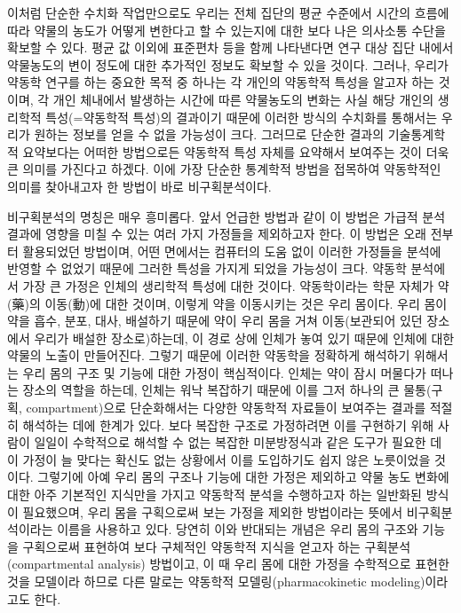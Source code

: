 \documentclass[
  11pt,
  krantz2, a4paper, twoside]{krantz}
\begin{document}
이처럼 단순한 수치화 작업만으로도 우리는 전체 집단의 평균 수준에서 시간의 흐름에 따라 약물의 농도가 어떻게 변한다고 할 수 있는지에 대한 보다 나은 의사소통 수단을 확보할 수 있다. 평균 값 이외에 표준편차 등을 함께 나타낸다면 연구 대상 집단 내에서 약물농도의 변이 정도에 대한 추가적인 정보도 확보할 수 있을 것이다. 그러나, 우리가 약동학 연구를 하는 중요한 목적 중 하나는 각 개인의 약동학적 특성을 알고자 하는 것이며, 각 개인 체내에서 발생하는 시간에 따른 약물농도의 변화는 사실 해당 개인의 생리학적 특성(=약동학적 특성)의 결과이기 때문에 이러한 방식의 수치화를 통해서는 우리가 원하는 정보를 얻을 수 없을 가능성이 크다. 그러므로 단순한 결과의 기술통계학적 요약보다는 어떠한 방법으로든 약동학적 특성 자체를 요약해서 보여주는 것이 더욱 큰 의미를 가진다고 하겠다. 이에 가장 단순한 통계학적 방법을 접목하여 약동학적인 의미를 찾아내고자 한 방법이 바로 비구획분석이다.

비구획분석의 명칭은 매우 흥미롭다. 앞서 언급한 방법과 같이 이 방법은 가급적 분석결과에 영향을 미칠 수 있는 여러 가지 가정들을 제외하고자 한다. 이 방법은 오래 전부터 활용되었던 방법이며, 어떤 면에서는 컴퓨터의 도움 없이 이러한 가정들을 분석에 반영할 수 없었기 때문에 그러한 특성을 가지게 되었을 가능성이 크다. 약동학 분석에서 가장 큰 가정은 인체의 생리학적 특성에 대한 것이다. 약동학이라는 학문 자체가 약(藥)의 이동(動)에 대한 것이며, 이렇게 약을 이동시키는 것은 우리 몸이다. 우리 몸이 약을 흡수, 분포, 대사, 배설하기 때문에 약이 우리 몸을 거쳐 이동(보관되어 있던 장소에서 우리가 배설한 장소로)하는데, 이 경로 상에 인체가 놓여 있기 때문에 인체에 대한 약물의 노출이 만들어진다. 그렇기 때문에 이러한 약동학을 정확하게 해석하기 위해서는 우리 몸의 구조 및 기능에 대한 가정이 핵심적이다. 인체는 약이 잠시 머물다가 떠나는 장소의 역할을 하는데, 인체는 워낙 복잡하기 때문에 이를 그저 하나의 큰 물통(구획, compartment)으로 단순화해서는 다양한 약동학적 자료들이 보여주는 결과를 적절히 해석하는 데에 한계가 있다. 보다 복잡한 구조로 가정하려면 이를 구현하기 위해 사람이 일일이 수학적으로 해석할 수 없는 복잡한 미분방정식과 같은 도구가 필요한 데 이 가정이 늘 맞다는 확신도 없는 상황에서 이를 도입하기도 쉽지 않은 노릇이었을 것이다. 그렇기에 아예 우리 몸의 구조나 기능에 대한 가정은 제외하고 약물 농도 변화에 대한 아주 기본적인 지식만을 가지고 약동학적 분석을 수행하고자 하는 일반화된 방식이 필요했으며, 우리 몸을 구획으로써 보는 가정을 제외한 방법이라는 뜻에서 비구획분석이라는 이름을 사용하고 있다. 당연히 이와 반대되는 개념은 우리 몸의 구조와 기능을 구획으로써 표현하여 보다 구체적인 약동학적 지식을 얻고자 하는 구획분석(compartmental analysis) 방법이고, 이 때 우리 몸에 대한 가정을 수학적으로 표현한 것을 모델이라 하므로 다른 말로는 약동학적 모델링(pharmacokinetic modeling)이라고도 한다.
\end{document}
